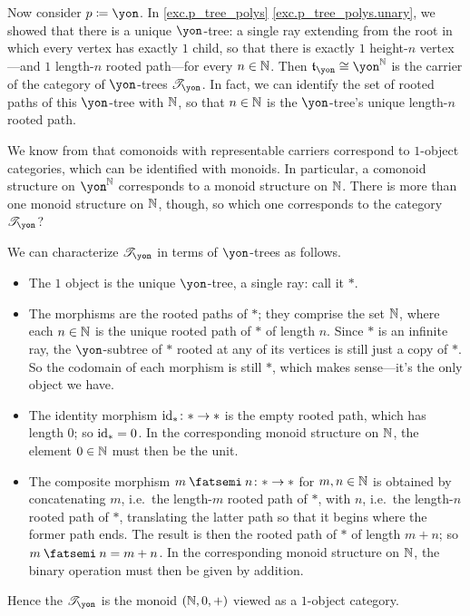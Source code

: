 \documentclass[Book-Poly]{subfiles}
\begin{document}
\begin{example}
Now consider $p\coloneqq\yon$.
In \cref{exc.p_tree_polys} \cref{exc.p_tree_polys.unary}, we showed that there is a unique $\yon$-tree: a single ray extending from the root in which every vertex has exactly $1$ child, so that there is exactly $1$ height-$n$ vertex---and $1$ length-$n$ rooted path---for every $n\in\mathbb{N}$.
Then $\ema{t}_\yon\iso\yon^\nn$ is the carrier of the category of $\yon$-trees $\cofree\yon$.
In fact, we can identify the set of rooted paths of this $\yon$-tree with $\mathbb{N}$, so that $n\in\mathbb{N}$ is the $\yon$-tree's unique length-$n$ rooted path.

We know from \label{ex.monoids} that comonoids with representable carriers correspond to $1$-object categories, which can be identified with monoids.
In particular, a comonoid structure on $\yon^\nn$ corresponds to a monoid structure on $\mathbb{N}$.
There is more than one monoid structure on $\mathbb{N}$, though, so which one corresponds to the category $\cofree\yon$?

We can characterize $\cofree\yon$ in terms of $\yon$-trees as follows.
\begin{itemize}
    \item The $1$ object is the unique $\yon$-tree, a single ray: call it $\ast$.
    \item The morphisms are the rooted paths of $\ast$; they comprise the set $\mathbb{N}$, where each $n\in\mathbb{N}$ is the unique rooted path of $\ast$ of length $n$.
    Since $\ast$ is an infinite ray, the $\yon$-subtree of $\ast$ rooted at any of its vertices is still just a copy of $\ast$.
    So the codomain of each morphism is still $\ast$, which makes sense---it's the only object we have.
    \item The identity morphism $\mathrm{id}_\ast\colon\ast\to\ast$ is the empty rooted path, which has length $0$; so $\mathrm{id}_\ast=0$.
    In the corresponding monoid structure on $\mathbb{N}$, the element $0\in\mathbb{N}$ must then be the unit.
    \item The composite morphism $m\then n\colon\ast\to\ast$ for $m,n\in\mathbb{N}$ is obtained by concatenating $m$, i.e.\ the length-$m$ rooted path of $\ast$, with $n$, i.e.\ the length-$n$ rooted path of $\ast$, translating the latter path so that it begins where the former path ends.
    The result is then the rooted path of $\ast$ of length $m+n$; so $m\then n=m+n$.
    In the corresponding monoid structure on $\mathbb{N}$, the binary operation must then be given by addition.
\end{itemize}
Hence the $\cofree{\yon}$ is the monoid $(\mathbb{N},0,+)$ viewed as a $1$-object category.
\end{example}
\end{document}

